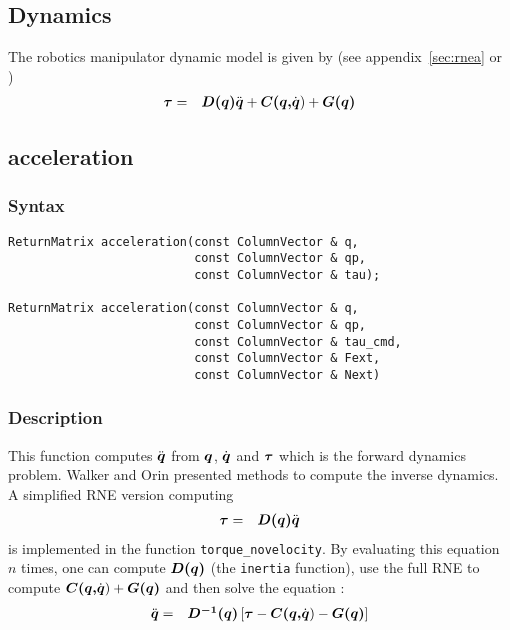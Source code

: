\documentclass[dvips,11pt,fleqn]{report}
\newcommand{\mbold}[1]{\mbox{\boldmath $ #1 $}}
\begin{document}
\newpage

\subsection{Dynamics}

The robotics manipulator dynamic model is given by (see
appendix~\ref{sec:rnea} or \cite{craig})
\begin{eqnarray}
\mbold{\tau} & = & \mbold{D(q)} \ddot{\mbold{q}} + \mbold{C(q,}\dot{\mbold{q}}) 
+ \mbold{G(q)}
\end{eqnarray}

\subsection*{acceleration}
\subsubsection*{Syntax}
\begin{verbatim}
ReturnMatrix acceleration(const ColumnVector & q, 
                          const ColumnVector & qp,
                          const ColumnVector & tau);

ReturnMatrix acceleration(const ColumnVector & q, 
                          const ColumnVector & qp,
                          const ColumnVector & tau_cmd, 
                          const ColumnVector & Fext,
                          const ColumnVector & Next)
\end{verbatim}
\subsubsection*{Description}
This function computes $\ddot{\mbold{q}}$ from $\mbold{q}$, $\dot{\mbold{q}}$ and $\mbold{\tau}$ 
which is the forward dynamics problem.
Walker and Orin \cite{Walker82} presented methods to compute the inverse dynamics. 
A simplified RNE version computing 
\begin{eqnarray}
\mbold{\tau} & = & \mbold{D(q)} \ddot{\mbold{q}}
\end{eqnarray}
is implemented in the function {\tt torque\_novelocity}. By evaluating this equation $n$ times, 
one can compute $\mbold{D(q)}$ (the {\tt inertia} function), use the full RNE to compute
$\mbold{C(q,}\dot{\mbold{q}}) + \mbold{G(q)}$ and then solve the equation : 
\begin{eqnarray}
\ddot{\mbold{q}} & = & \mbold{D^{-1}(q)} \left [ \mbold{\tau} - \mbold{C(q,}\dot{\mbold{q}}) 
- \mbold{G(q)} \right ]
\end{eqnarray}
\end{document}
